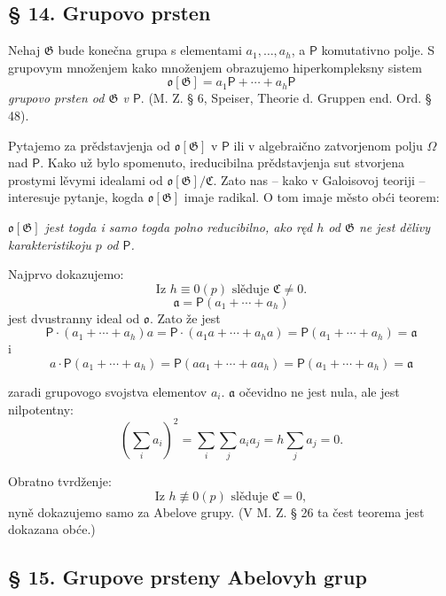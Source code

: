 \documentclass[11pt]{article}
\begin{document}
\subsection*{§ 14. Grupovo prsten}\label{der-gruppenring}

Nehaj \(\mathfrak G\) bude konečna grupa s elementami \(a_1,\ldots,a_h\), a \(\mathsf P\) komutativno polje. S grupovym množenjem kako množenjem obrazujemo hiperkompleksny sistem
\[
\mathfrak o[\mathfrak G]=a_1\mathsf P+\cdots+a_h\mathsf P
\]
\emph{grupovo prsten od \(\mathfrak G\) v \(\mathsf P\)}. (M. Z. § 6, Speiser, Theorie d. Gruppen end. Ord. § 48).

Pytajemo za prědstavjenja od \(\mathfrak o[\mathfrak G]\) v \(\mathsf P\) ili v algebraično zatvorjenom polju \(\Omega\) nad \(\mathsf P\). Kako už bylo spomenuto, ireducibilna prědstavjenja sut stvorjena prostymi lěvymi idealami od \(\mathfrak o[\mathfrak G]/\mathfrak C\). Zato nas -- kako v Galoisovoj teoriji -- interesuje pytanje, kogda \(\mathfrak o[\mathfrak G]\) imaje radikal. O tom imaje město obći teorem:

\begin{center}
\emph{\(\mathfrak o[\mathfrak G]\) jest togda i samo togda polno reducibilno, ako ręd \(h\) od \(\mathfrak G\) ne jest dělivy karakteristikoju \(p\) od \(\mathsf P\).}
\end{center}

Najprvo dokazujemo:
\[
\text{Iz } h\equiv0(p) \text{ slěduje } \mathfrak C\ne 0.
\]
\[
\mathfrak a=\mathsf P(a_1+\cdots+a_h)
\]
jest dvustranny ideal od \(\mathfrak o\). Zato že jest
\[
\mathsf P\cdot(a_1+\cdots+a_h)a
=\mathsf P\cdot(a_1a+\cdots+a_ha)
=\mathsf P(a_1+\cdots+a_h)=\mathfrak a
\]
i
\[
a\cdot\mathsf P(a_1+\cdots+a_h)
=\mathsf P(aa_1+\cdots+aa_h)
=\mathsf P(a_1+\cdots+a_h)=\mathfrak a
\]

zaradi grupovogo svojstva elementov \(a_i\). \(\mathfrak a\) očevidno ne jest nula, ale jest nilpotentny:
\[
\left(\sum_i a_i\right)^2=\sum_i\sum_j a_i a_j
=h\sum_j a_j=0.
\]

Obratno tvrdženje:
\[
\text{Iz } h\not\equiv0(p) \text{ slěduje } \mathfrak C=0,
\]
nyně dokazujemo samo za Abelove grupy. (V M. Z. § 26 ta čest teorema jest dokazana obće.)

\subsection*{§ 15. Grupove prsteny Abelovyh grup}\label{die-gruppenringe-abelscher-gruppen}
\end{document}
